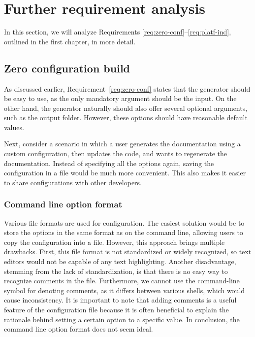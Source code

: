 \section{Further requirement analysis}
\label{sec:analysis-further-analysis}

In this section, we will analyze Requirements \ref{req:zero-conf}--\ref{req:platf-ind}, outlined in the first chapter, in more detail.

\subsection*{Zero configuration build}

As discussed earlier, Requirement~\ref{req:zero-conf} states that the generator should be easy 
to use, as the only mandatory argument should be the input.
On the other hand, the generator naturally should also offer several optional arguments, such as the output folder.
However, these options should have reasonable default values.

Next, consider a scenario in which a user generates the documentation using a custom configuration, then updates the code, and wants to regenerate the documentation.
Instead of specifying all the options again, saving the configuration in a file would be much more convenient.
This also makes it easier to share configurations with other developers.

\subsubsection*{Command line option format}

Various file formats are used for configuration.
The easiest solution would be to store the options in the same format as on the command line, 
allowing users to copy the configuration into a file. 
However, this approach brings multiple drawbacks.
First, this file format is not standardized or widely recognized, so text editors would not be capable of any text highlighting.
Another disadvantage, stemming from the lack of standardization, is that there is no easy way to recognize comments in the file.
Furthermore, we cannot use the command-line symbol for denoting comments, as it differs between various shells, which would cause inconsistency.
It is important to note that adding comments is a useful feature of the configuration file because it is often beneficial to explain the rationale behind setting a certain option to a specific value.
In conclusion, the command line option format does not seem ideal.


